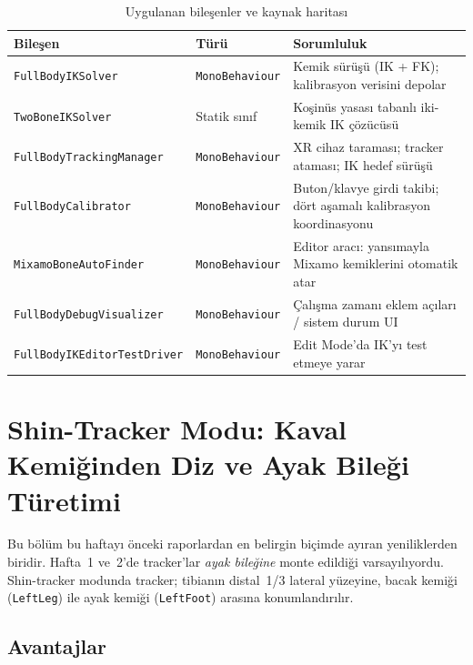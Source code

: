 \documentclass[11pt,a4paper]{article}
\begin{document}
\begin{table}[H]
\centering
\caption{Uygulanan bile\c{s}enler ve kaynak haritası}
\label{tab:bilesenlertablo2}
\renewcommand{\arraystretch}{1.25}
\begin{tabularx}{\textwidth}{llX}
\toprule
\textbf{Bile\c{s}en} & \textbf{Türü} & \textbf{Sorumluluk} \\
\midrule
\texttt{FullBodyIKSolver}       & \texttt{MonoBehaviour} & Kemik s\"ur\"u\c{s}\"u (IK + FK); kalibrasyon verisini depolar \\
\texttt{TwoBoneIKSolver}        & Statik s{\i}n{\i}f      & Ko\c{s}in\"us yasas{\i} tabanl{\i} iki-kemik IK \c{c}\"oz\"uc\"us\"u \\
\texttt{FullBodyTrackingManager}& \texttt{MonoBehaviour} & XR cihaz taramas{\i}; tracker ataması; IK hedef s\"ur\"u\c{s}\"u \\
\texttt{FullBodyCalibrator}     & \texttt{MonoBehaviour} & Buton/klavye girdi takibi; d\"ort a\c{s}amal{\i} kalibrasyon koordinasyonu \\
\texttt{MixamoBoneAutoFinder}   & \texttt{MonoBehaviour} & Editor arac{\i}: yans{\i}mayla Mixamo kemiklerini otomatik atar \\
\texttt{FullBodyDebugVisualizer}& \texttt{MonoBehaviour} & \c{C}al{\i}\c{s}ma zaman{\i} eklem a\c{c}{\i}lar{\i} / sistem durum UI \\
\texttt{FullBodyIKEditorTestDriver}& \texttt{MonoBehaviour} & Edit Mode'da IK'y{\i} test etmeye yarar \\
\bottomrule
\end{tabularx}
\end{table}

\section{Shin-Tracker Modu: Kaval Kemi\u{g}inden Diz ve Ayak Bile\u{g}i T\"uretimi}
\label{sec:shin}

Bu b\"ol\"um bu haftay{\i} \"onceki raporlardan en belirgin bi\c{c}imde
ay{\i}ran yeniliklerden biridir. Hafta~1 ve~2'de tracker'lar
\textit{ayak bile\u{g}ine} monte edildi\u{g}i varsay{\i}l{\i}yordu.
Shin-tracker modunda tracker; tibian{\i}n distal~1/3 lateral
y\"uzeyine, bacak kemi\u{g}i (\texttt{LeftLeg}) ile ayak kemi\u{g}i
(\texttt{LeftFoot}) aras{\i}na konumland{\i}r{\i}l{\i}r.

\subsection{Avantajlar}
\end{document}
